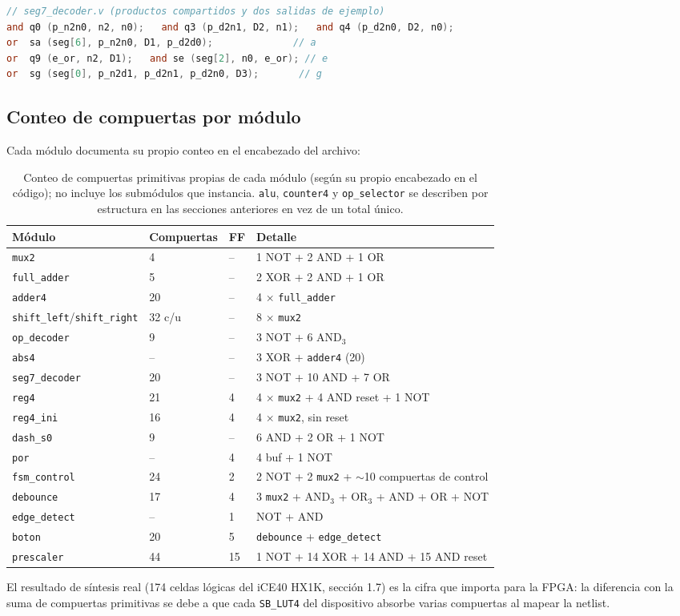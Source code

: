 \documentclass[11pt,a4paper]{article}
\newcommand{\sig}[1]{\texttt{#1}}
\begin{document}
\begin{lstlisting}[language=Verilog]
// seg7_decoder.v (productos compartidos y dos salidas de ejemplo)
and q0 (p_n2n0, n2, n0);   and q3 (p_d2n1, D2, n1);   and q4 (p_d2n0, D2, n0);
or  sa (seg[6], p_n2n0, D1, p_d2d0);              // a
or  q9 (e_or, n2, D1);   and se (seg[2], n0, e_or); // e
or  sg (seg[0], p_n2d1, p_d2n1, p_d2n0, D3);       // g
\end{lstlisting}

\subsection{Conteo de compuertas por módulo}

Cada módulo documenta su propio conteo en el encabezado del archivo:

\begin{table}[H]
\centering\small
\begin{tabular}{@{}llll@{}}
\toprule
\textbf{Módulo} & \textbf{Compuertas} & \textbf{FF} & \textbf{Detalle} \\
\midrule
\sig{mux2}         & 4  & -- & 1 NOT + 2 AND + 1 OR \\
\sig{full\_adder}  & 5  & -- & 2 XOR + 2 AND + 1 OR \\
\sig{adder4}       & 20 & -- & 4 $\times$ \sig{full\_adder} \\
\sig{shift\_left}/\sig{shift\_right} & 32 c/u & -- & 8 $\times$ \sig{mux2} \\
\sig{op\_decoder}  & 9  & -- & 3 NOT + 6 AND$_3$ \\
\sig{abs4}         & --  & -- & 3 XOR + \sig{adder4} (20) \\
\sig{seg7\_decoder}& 20 & -- & 3 NOT + 10 AND + 7 OR \\
\sig{reg4}         & 21 & 4  & 4 $\times$ \sig{mux2} + 4 AND reset + 1 NOT \\
\sig{reg4\_ini}    & 16 & 4  & 4 $\times$ \sig{mux2}, sin reset \\
\sig{dash\_s0}     & 9  & -- & 6 AND + 2 OR + 1 NOT \\
\sig{por}          & --  & 4  & 4 buf + 1 NOT \\
\sig{fsm\_control} & 24 & 2  & 2 NOT + 2 \sig{mux2} + $\sim$10 compuertas de control \\
\sig{debounce}     & 17 & 4  & 3 \sig{mux2} + AND$_3$ + OR$_3$ + AND + OR + NOT \\
\sig{edge\_detect} & --  & 1  & NOT + AND \\
\sig{boton}        & 20 & 5  & \sig{debounce} + \sig{edge\_detect} \\
\sig{prescaler}    & 44 & 15 & 1 NOT + 14 XOR + 14 AND + 15 AND reset \\
\bottomrule
\end{tabular}
\caption{Conteo de compuertas primitivas propias de cada módulo (según su propio encabezado en el código); no incluye los submódulos que instancia. \sig{alu}, \sig{counter4} y \sig{op\_selector} se describen por estructura en las secciones anteriores en vez de un total único.}
\end{table}

El resultado de síntesis real (174 celdas lógicas del iCE40 HX1K, sección 1.7) es la cifra que importa para la FPGA: la diferencia con la suma de compuertas primitivas se debe a que cada \sig{SB\_LUT4} del dispositivo absorbe varias compuertas al mapear la netlist.
\end{document}
